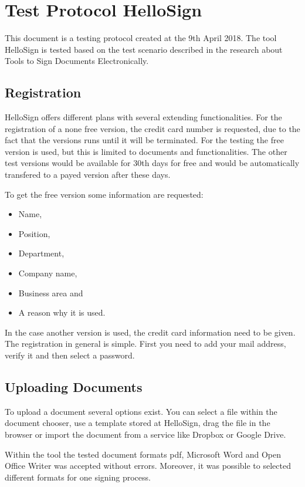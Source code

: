 \section{Test Protocol HelloSign} \label{sec:hellosign}
This document is a testing protocol created at the 9th April 2018. The tool HelloSign is tested based on the test scenario described in the research about Tools to Sign Documents Electronically.

\subsection{Registration}
HelloSign offers different plans with several extending functionalities. For the registration of a none free version, the credit card number is requested, due to the fact that the versions runs until it will be terminated. For the testing the free version is used, but this is limited to documents and functionalities. The other test versions would be available for 30th days for free and would be automatically transfered to a payed version after these days.

To get the free version some information are requested:
\begin{itemize}
	\item Name,
	\item Position,
	\item Department,
	\item Company name,
	\item Business area and
	\item A reason why it is used.
\end{itemize}
In the case another version is used, the credit card information need to be given. \newline
The registration in general is simple. First you need to add your mail address, verify it and then select a password.

\subsection{Uploading Documents}
To upload a document several options exist. You can select a file within the document chooser, use a template stored at HelloSign, drag the file in the browser or import the document from a service like Dropbox or Google Drive.

Within the tool the tested document formats \gls{pdf}, Microsoft Word and Open Office Writer was accepted without errors. Moreover, it was possible to selected different formats for one signing process.

